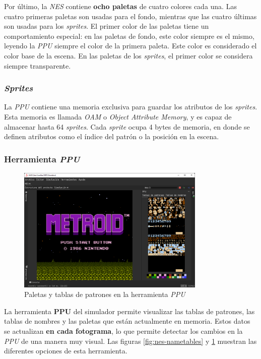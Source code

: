 Por último, la \textit{NES} contiene \textbf{ocho paletas}
de cuatro colores cada una.
Las cuatro primeras paletas son usadas para el fondo,
mientras que las cuatro últimas son usadas para los \textit{sprites}.
El primer color de las paletas tiene un comportamiento especial:
en las paletas de fondo, este color siempre es el mismo,
leyendo la \textit{PPU} siempre el color de la primera paleta.
Este color es considerado el color base de la escena.
En las paletas de los \textit{sprites}, el primer color
se considera siempre transparente.

\subsubsection{\textit{Sprites}}\label{subsubsec:sprites}

La \textit{PPU} contiene una memoria exclusiva para guardar
los atributos de los \textit{sprites}.
Esta memoria es llamada \textit{OAM} o \textit{Object Attribute Memory},
y es capaz de almacenar hasta 64 \textit{sprites}.
Cada \textit{sprite} ocupa 4 bytes de memoria, en donde se
definen atributos como el índice del patrón o la posición en la escena.

\subsubsection{Herramienta \textit{PPU}}

\begin{figure}[h]
    \centering
    \includegraphics[width=0.8\textwidth]{images/nes/nes-patterntables}
    \caption{Paletas y tablas de patrones en la herramienta \textit{PPU}}
    \label{fig:nes-patterntables}
\end{figure}

La herramienta \textbf{PPU} del simulador permite
visualizar las tablas de patrones, las tablas de nombres
y las paletas que están actualmente en memoria.
Estos datos se actualizan \textbf{en cada fotograma},
lo que permite detectar los cambios en la \textit{PPU}
de una manera muy visual.
Las figuras \ref{fig:nes-nametables} y \ref{fig:nes-patterntables}
muestran las diferentes opciones de esta herramienta.

